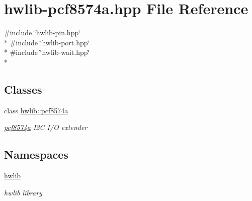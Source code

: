\hypertarget{hwlib-pcf8574a_8hpp}{}\section{hwlib-\/pcf8574a.hpp File Reference}
\label{hwlib-pcf8574a_8hpp}
{\ttfamily \#include \char`\"{}hwlib-\/pin.\+hpp\char`\"{}}\\*
{\ttfamily \#include \char`\"{}hwlib-\/port.\+hpp\char`\"{}}\\*
{\ttfamily \#include \char`\"{}hwlib-\/wait.\+hpp\char`\"{}}\\*
\subsection*{Classes}
\begin{DoxyCompactItemize}
\item 
class \hyperlink{classhwlib_1_1pcf8574a}{hwlib\+::pcf8574a}
\begin{DoxyCompactList}\small\item\em \hyperlink{classhwlib_1_1pcf8574a}{pcf8574a} I2C I/O extender \end{DoxyCompactList}\end{DoxyCompactItemize}
\subsection*{Namespaces}
\begin{DoxyCompactItemize}
\item 
 \hyperlink{namespacehwlib}{hwlib}
\begin{DoxyCompactList}\small\item\em hwlib library \end{DoxyCompactList}\end{DoxyCompactItemize}
